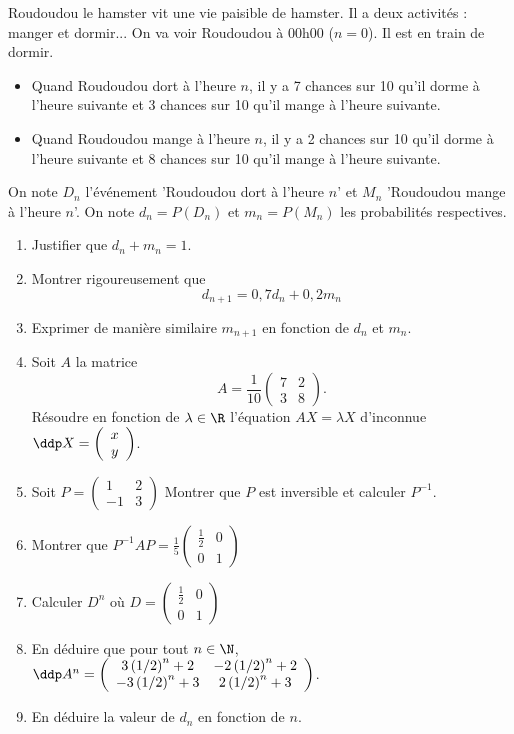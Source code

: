 \documentclass[a4paper, 11pt,reqno]{article}
\begin{document}
\begin{exercice}
Roudoudou le hamster vit une vie paisible de hamster. Il a deux activités : manger et  dormir... 
On va voir Roudoudou à 00h00 ($n=0$). Il est en train de dormir. 
\begin{itemize}
\item Quand Roudoudou dort à l'heure $n$, il y a 7 chances sur 10 qu'il dorme à l'heure suivante et 3 chances sur 10 qu'il mange à l'heure suivante. 
\item Quand Roudoudou mange à l'heure $n$, il y a 2 chances sur 10 qu'il dorme à l'heure suivante et 8 chances sur 10 qu'il mange à l'heure suivante. 
\end{itemize}


On note $D_n$ l'événement 'Roudoudou dort à l'heure $n$' et $M_n$ 'Roudoudou mange à l'heure $n$'. On note $d_n =P(D_n)$ et $m_n=P(M_n)$ les probabilités respectives. 


\begin{enumerate}
\item Justifier que $d_n+m_n=1$. 
\item Montrer rigoureusement que $$d_{n+1} =  0,7d_n+0,2m_n$$
\item Exprimer de manière similaire $m_{n+1} $ en fonction de $d_n$ et $m_n$. 

\item Soit $A$ la matrice $$A=\frac{1}{10}\left(\begin{array}{ccc}
7 & 2\\
3 & 8
\end{array}
\right).$$
Résoudre en fonction de $\lambda \in \R$ l'équation $AX = \lambda X$ d'inconnue $\ddp X =\left(\begin{array}{c}
x \\
y 
\end{array}
\right)$. 
\item Soit $P = 
\left(\begin{array}{cc}
1 & 2\\	
-1 & 3
\end{array}
\right)$ Montrer que $P$ est inversible et calculer $P^{-1}$. 
\item Montrer que $P^{-1} A P =\frac{1}{5} \left(\begin{array}{cc}
 \frac{1}{2}& 0\\
0 &  1 
\end{array}
\right)$
\item Calculer $D^n$ où $D=\left(\begin{array}{cc}
 \frac{1}{2}& 0\\
0 &  1 
\end{array}
\right)$

\item En déduire que pour tout  $n\in \N$, $\ddp A^n=\left(\begin{array}{ccc}
3\left( 1/2\right)^n +2 & -2\left( 1/2\right)^n +2\\
-3\left( 1/2\right)^n +3& 2\left( 1/2\right)^n +3
\end{array}
\right)$.
\item En déduire la valeur de $d_n$ en fonction de $n$. 
\end{enumerate}
\end{exercice}
\end{document}
